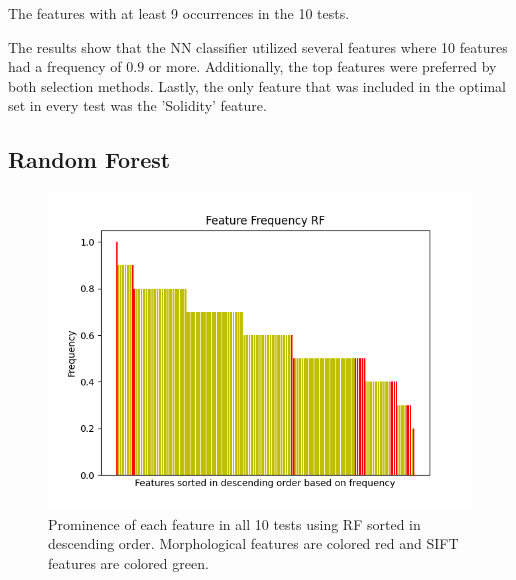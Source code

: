 \documentclass{kththesis}
\begin{document}
\begin{table}[h!]
  \begin{center}
    \caption{The features with at least 9 occurrences in the 10 tests.}
  \end{center}
  \label{nn_features}
\end{table}

The results show that the NN classifier utilized several features where 10 features had a frequency of $0.9$ or more. Additionally, the top features were preferred by both selection methods. Lastly, the only feature that was included in the optimal set in every test was the 'Solidity' feature.

\newpage

\subsection{Random Forest}

\begin{figure}[h!]
  \centering
  \includegraphics[scale=0.8]{figures/rf_all_freqs.png}
  \caption{Prominence of each feature in all 10 tests using RF sorted in descending order. Morphological features are colored red and SIFT features are colored green.}
  \label{fig:freqs_rf}
\end{figure}
\end{document}
